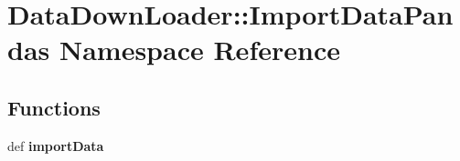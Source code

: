 \hypertarget{namespaceDataDownLoader_1_1ImportDataPandas}{\section{\-Data\-Down\-Loader\-:\-:\-Import\-Data\-Pandas \-Namespace \-Reference}
\label{namespaceDataDownLoader_1_1ImportDataPandas}
}
\subsection*{\-Functions}
\begin{DoxyCompactItemize}
\item 
\hypertarget{namespaceDataDownLoader_1_1ImportDataPandas_ac879be8d0bed3ca8287fdcd5774fc394}{def {\bfseries import\-Data}}\label{namespaceDataDownLoader_1_1ImportDataPandas_ac879be8d0bed3ca8287fdcd5774fc394}

\end{DoxyCompactItemize}

